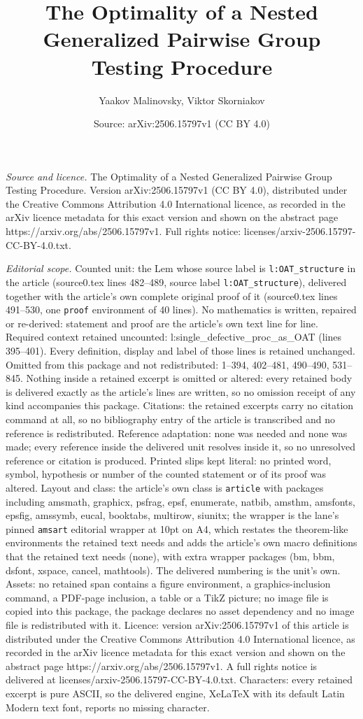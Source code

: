 \documentclass[10pt,a4paper]{amsart}
\title[The Optimality of a Nested Generalized Pairwise Group Testin]{The Optimality of a Nested Generalized Pairwise Group Testing Procedure}
\author{Yaakov Malinovsky, Viktor Skorniakov}
\date{Source: arXiv:2506.15797v1 (CC BY 4.0)}
\begin{document}
\maketitle

\noindent\emph{Source and licence.} The Optimality of a Nested Generalized Pairwise Group Testing Procedure. Version arXiv:2506.15797v1 (CC BY 4.0), distributed under the Creative Commons Attribution 4.0 International licence, as recorded in the arXiv licence metadata for this exact version and shown on the abstract page https://arxiv.org/abs/2506.15797v1. Full rights notice: licenses/arxiv-2506.15797-CC-BY-4.0.txt.\par\smallskip

\noindent\textit{Editorial scope.} Counted unit: the Lem whose source label is \texttt{l:OAT\_structure} in the article (source0.tex lines 482--489, source label \texttt{l:OAT\_structure}), delivered together with the article's own complete original proof of it (source0.tex lines 491--530, one \texttt{proof} environment of 40 lines). No mathematics is written, repaired or re-derived: statement and proof are the article's own text line for line. Required context retained uncounted: l:single\_defective\_proc\_as\_OAT (lines 395--401). Every definition, display and label of those lines is retained unchanged. Omitted from this package and not redistributed: 1--394, 402--481, 490--490, 531--845. Nothing inside a retained excerpt is omitted or altered: every retained body is delivered exactly as the article's lines are written, so no omission receipt of any kind accompanies this package. Citations: the retained excerpts carry no citation command at all, so no bibliography entry of the article is transcribed and no reference is redistributed. Reference adaptation: none was needed and none was made; every reference inside the delivered unit resolves inside it, so no unresolved reference or citation is produced. Printed slips kept literal: no printed word, symbol, hypothesis or number of the counted statement or of its proof was altered. Layout and class: the article's own class is \texttt{article} with packages including amsmath, graphicx, psfrag, epsf, enumerate, natbib, amsthm, amsfonts, epsfig, amssymb, eucal, booktabs, multirow, siunitx; the wrapper is the lane's pinned \texttt{amsart} editorial wrapper at 10pt on A4, which restates the theorem-like environments the retained text needs and adds the article's own macro definitions that the retained text needs (none), with extra wrapper packages (bm, bbm, dsfont, xspace, cancel, mathtools). The delivered numbering is the unit's own. Assets: no retained span contains a figure environment, a graphics-inclusion command, a PDF-page inclusion, a table or a TikZ picture; no image file is copied into this package, the package declares no asset dependency and no image file is redistributed with it. Licence: version arXiv:2506.15797v1 of this article is distributed under the Creative Commons Attribution 4.0 International licence, as recorded in the arXiv licence metadata for this exact version and shown on the abstract page https://arxiv.org/abs/2506.15797v1. A full rights notice is delivered at licenses/arxiv-2506.15797-CC-BY-4.0.txt. Characters: every retained excerpt is pure ASCII, so the delivered engine, XeLaTeX with its default Latin Modern text font, reports no missing character.
\end{document}
